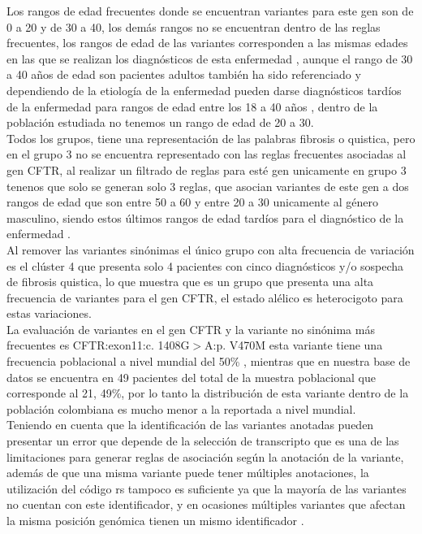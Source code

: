 Los rangos de edad frecuentes donde se encuentran variantes para este gen son de 0 a 20 y de 30 a 40, los demás rangos no se encuentran dentro de las reglas frecuentes, los rangos de edad de las variantes corresponden a las mismas edades en las que se realizan los diagnósticos de esta enfermedad \cite{Terlizzi2017b}, aunque el rango de 30 a 40 años de edad son pacientes adultos también ha sido referenciado y dependiendo de la etiología de la enfermedad pueden darse diagnósticos tardíos de la enfermedad para rangos de edad entre los 18 a 40 años \cite{Farrell2008}, dentro de la población estudiada no tenemos un rango de edad de 20 a 30. \\

Todos los grupos, tiene una representación de las palabras fibrosis o quistica, pero en el grupo 3 no se encuentra representado con las reglas frecuentes asociadas al gen CFTR, al realizar un filtrado de reglas para esté gen unicamente en grupo 3 tenenos que solo se generan solo 3 reglas, que asocian variantes de este gen a dos rangos de edad que son entre 50 a 60 y entre 20 a 30 unicamente al género masculino, siendo estos últimos rangos de edad tardíos para el diagnóstico de la enfermedad \cite{Farrell2008}. \\

Al remover las variantes sinónimas el único grupo con alta frecuencia de variación es el clúster 4 que presenta solo 4 pacientes con cinco diagnósticos y/o sospecha de fibrosis quistica, lo que muestra que es un grupo que presenta una alta frecuencia de variantes para el gen CFTR, el estado alélico es heterocigoto para estas variaciones. \\

La evaluación de variantes en el gen CFTR y la variante no sinónima más frecuentes es CFTR:exon11:c. 1408G$>$A:p. V470M esta variante tiene una frecuencia poblacional a nivel mundial del 50\% \cite{Zerbino2018}, mientras que en  nuestra base de datos se encuentra en 49 pacientes del total de la muestra poblacional que corresponde al 21, 49\%, por lo tanto la distribución de esta variante dentro de la población colombiana es mucho menor a la reportada a nivel mundial. \\

Teniendo en cuenta que la identificación de las variantes anotadas pueden presentar un error que depende de la selección de transcripto que es una de las limitaciones para generar reglas de asociación según la anotación de la variante, además de que una misma variante puede tener múltiples anotaciones, la utilización del código rs tampoco es suficiente ya que la mayoría de las variantes no cuentan con este identificador, y en ocasiones múltiples variantes que afectan la misma posición genómica tienen un mismo identificador \cite{Liu2016, McCarthy2014}. \\  

